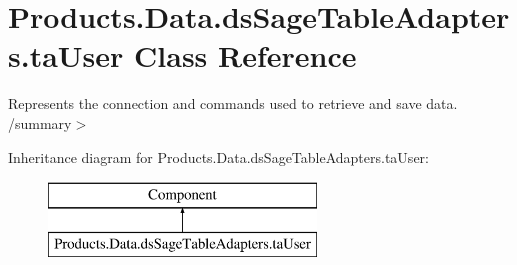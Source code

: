 \hypertarget{class_products_1_1_data_1_1ds_sage_table_adapters_1_1ta_user}{}\section{Products.\+Data.\+ds\+Sage\+Table\+Adapters.\+ta\+User Class Reference}
\label{class_products_1_1_data_1_1ds_sage_table_adapters_1_1ta_user}


Represents the connection and commands used to retrieve and save data. /summary$>$  


Inheritance diagram for Products.\+Data.\+ds\+Sage\+Table\+Adapters.\+ta\+User\+:\begin{figure}[H]
\begin{center}
\leavevmode
\includegraphics[height=2.000000cm]{class_products_1_1_data_1_1ds_sage_table_adapters_1_1ta_user}
\end{center}
\end{figure}
